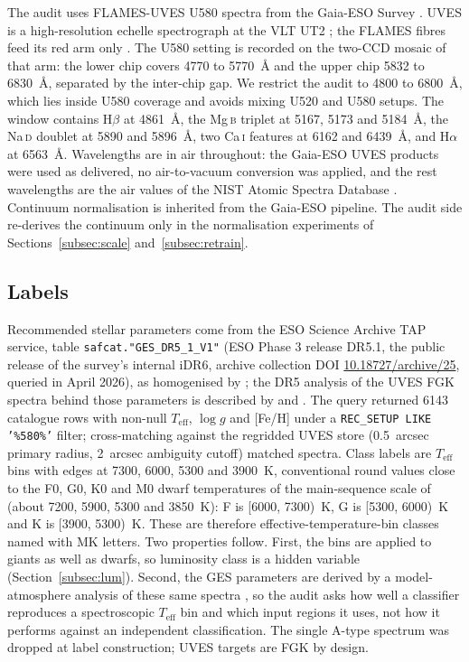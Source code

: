 \documentclass[11pt,a4paper]{article}
\newcommand{\Halpha}{H$\alpha$\xspace}
\newcommand{\Hbeta}{H$\beta$\xspace}
\newcommand{\Mgb}{Mg\,\textsc{b}\xspace}
\newcommand{\NaD}{Na\,\textsc{d}\xspace}
\newcommand{\CaI}{Ca\,\textsc{i}\xspace}
\newcommand{\Teff}{$T_{\mathrm{eff}}$\xspace}
\begin{document}
The audit uses FLAMES-UVES U580 spectra from the Gaia-ESO Survey \citep{2022A&A...666A.120G}. UVES is a high-resolution echelle spectrograph at the VLT UT2 \citep{2000SPIE.4008..534D}; the FLAMES fibres feed its red arm only \citep{2002Msngr.110....1P}. The U580 setting is recorded on the two-CCD mosaic of that arm: the lower chip covers 4770 to 5770~\AA{} and the upper chip 5832 to 6830~\AA, separated by the inter-chip gap. We restrict the audit to 4800 to 6800~\AA, which lies inside U580 coverage and avoids mixing U520 and U580 setups. The window contains \Hbeta at 4861~\AA, the \Mgb triplet at 5167, 5173 and 5184~\AA, the \NaD doublet at 5890 and 5896~\AA, two \CaI features at 6162 and 6439~\AA, and \Halpha at 6563~\AA. Wavelengths are in air throughout: the Gaia-ESO UVES products were used as delivered, no air-to-vacuum conversion was applied, and the rest wavelengths are the air values of the NIST Atomic Spectra Database \citep{NIST_ASD_2023}. Continuum normalisation is inherited from the Gaia-ESO pipeline. The audit side re-derives the continuum only in the normalisation experiments of Sections~\ref{subsec:scale} and~\ref{subsec:retrain}.

\subsection{Labels}
\label{subsec:labels}

Recommended stellar parameters come from the ESO Science Archive TAP service, table \texttt{safcat."GES\_DR5\_1\_V1"} (ESO Phase 3 release DR5.1, the public release of the survey's internal iDR6, archive collection DOI \href{https://doi.org/10.18727/archive/25}{10.18727/archive/25}, queried in April 2026), as homogenised by \citet{2023A&A...676A.129H}; the DR5 analysis of the UVES FGK spectra behind those parameters is described by \citet{2014A&A...570A.122S} and \citet{Worley2024GESDR5}. The query returned 6143 catalogue rows with non-null \Teff, $\log g$ and [Fe/H] under a \texttt{REC\_SETUP LIKE '\%580\%'} filter; cross-matching against the regridded UVES store (0.5~arcsec primary radius, 2~arcsec ambiguity cutoff) matched \nMatched{} spectra. Class labels are \Teff bins with edges at 7300, 6000, 5300 and 3900~K, conventional round values close to the F0, G0, K0 and M0 dwarf temperatures of the main-sequence scale of \citet{2013ApJS..208....9P} (about 7200, 5900, 5300 and 3850~K): F is [6000, 7300)~K, G is [5300, 6000)~K and K is [3900, 5300)~K. These are therefore effective-temperature-bin classes named with MK letters. Two properties follow. First, the bins are applied to giants as well as dwarfs, so luminosity class is a hidden variable (Section~\ref{subsec:lum}). Second, the GES parameters are derived by a model-atmosphere analysis of these same spectra \citep{2014A&A...570A.122S}, so the audit asks how well a classifier reproduces a spectroscopic \Teff bin and which input regions it uses, not how it performs against an independent classification. The single A-type spectrum was dropped at label construction; UVES targets are FGK by design.
\end{document}
